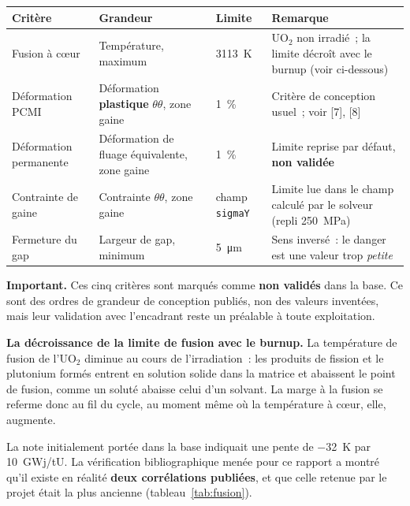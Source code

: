 \documentclass[12pt,a4paper,french]{report}
\begin{document}
\noindent
\begin{tabularx}{\textwidth}{@{}>{\raggedright\arraybackslash}p{3.3cm}
                                >{\raggedright\arraybackslash}p{2.2cm}
                                >{\raggedright\arraybackslash}p{1.9cm}
                                X@{}}
\toprule
\textbf{Critère} & \textbf{Grandeur} & \textbf{Limite} & \textbf{Remarque}\\
\midrule
Fusion à c\oe ur & Température, maximum & \SI{3113}{\kelvin} &
  $\mathrm{UO_2}$ non irradié~; la limite décroît avec le burnup (voir
  ci-dessous)\\
Déformation PCMI & Déformation \textbf{plastique} $\theta\theta$, zone gaine &
  \SI{1}{\percent} & Critère de conception usuel~; voir [7], [8]\\
Déformation permanente & Déformation de fluage équivalente, zone gaine &
  \SI{1}{\percent} & Limite reprise par défaut, \textbf{non validée}\\
Contrainte de gaine & Contrainte $\theta\theta$, zone gaine &
  champ \texttt{sigmaY} & Limite lue dans le champ calculé par le solveur
  (repli \SI{250}{\mega\pascal})\\
Fermeture du gap & Largeur de gap, minimum & \SI{5}{\micro\metre} &
  Sens inversé~: le danger est une valeur trop \emph{petite}\\
\bottomrule
\end{tabularx}

\vspace{0.4cm}
\noindent
\textcolor{cAlert}{\textbf{Important.}} Ces cinq critères sont marqués comme
\textbf{non validés} dans la base. Ce sont des ordres de grandeur de conception
publiés, non des valeurs inventées, mais leur validation avec l'encadrant reste
un préalable à toute exploitation.

\vspace{0.4cm}
\noindent
\textbf{La décroissance de la limite de fusion avec le burnup.} La température
de fusion de l'$\mathrm{UO_2}$ diminue au cours de l'irradiation~: les produits
de fission et le plutonium formés entrent en solution solide dans la matrice et
abaissent le point de fusion, comme un soluté abaisse celui d'un solvant. La
marge à la fusion se referme donc au fil du cycle, au moment même où la
température à c\oe ur, elle, augmente.

La note initialement portée dans la base indiquait une pente de
\SI{-32}{\kelvin} par \num{10}~GWj/tU. La vérification bibliographique menée
pour ce rapport a montré qu'il existe en réalité \textbf{deux corrélations
publiées}, et que celle retenue par le projet était la plus ancienne
(tableau~\ref{tab:fusion}).
\end{document}
